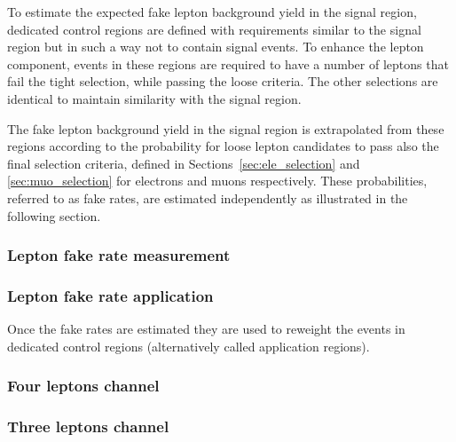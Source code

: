 \label{sec:fake_leptons}
To estimate the expected fake lepton background yield in the signal region,
dedicated control regions are defined with requirements similar to the signal region but in such a way not to contain signal events.
To enhance the \nonprompt lepton component, events in these regions are required to
have a number of leptons that fail the tight selection, while passing the loose criteria.
The other selections are identical to maintain similarity with the signal region.

The fake lepton background yield in the signal region is extrapolated from these regions
according to the probability for loose lepton candidates to pass also the final selection criteria,
defined in Sections~\ref{sec:ele_selection} and \ref{sec:muo_selection} for electrons and muons respectively.
These probabilities, referred to as fake rates, are estimated independently as illustrated in the following section.

\subsubsection{Lepton fake rate measurement}


\subsubsection{Lepton fake rate application}
Once the fake rates are estimated they are used to reweight the events
in dedicated control regions (alternatively called application regions).

\subsubsection{Four leptons channel}


\subsubsection{Three leptons channel}


